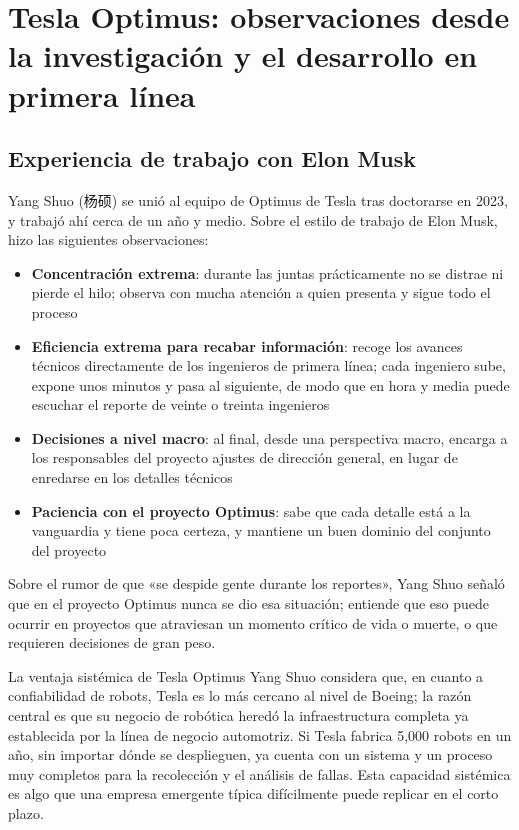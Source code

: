 \section{Tesla Optimus: observaciones desde la investigación y el desarrollo en primera línea}

\subsection{Experiencia de trabajo con Elon Musk}

Yang Shuo (杨硕) se unió al equipo de Optimus de Tesla tras doctorarse en 2023, y trabajó ahí cerca de un año y medio. Sobre el estilo de trabajo de Elon Musk, hizo las siguientes observaciones:

\begin{itemize}
    \item \textbf{Concentración extrema}: durante las juntas prácticamente no se distrae ni pierde el hilo; observa con mucha atención a quien presenta y sigue todo el proceso
    \item \textbf{Eficiencia extrema para recabar información}: recoge los avances técnicos directamente de los ingenieros de primera línea; cada ingeniero sube, expone unos minutos y pasa al siguiente, de modo que en hora y media puede escuchar el reporte de veinte o treinta ingenieros
    \item \textbf{Decisiones a nivel macro}: al final, desde una perspectiva macro, encarga a los responsables del proyecto ajustes de dirección general, en lugar de enredarse en los detalles técnicos
    \item \textbf{Paciencia con el proyecto Optimus}: sabe que cada detalle está a la vanguardia y tiene poca certeza, y mantiene un buen dominio del conjunto del proyecto
\end{itemize}

Sobre el rumor de que «se despide gente durante los reportes», Yang Shuo señaló que en el proyecto Optimus nunca se dio esa situación; entiende que eso puede ocurrir en proyectos que atraviesan un momento crítico de vida o muerte, o que requieren decisiones de gran peso.

\begin{knowledgebox}{La ventaja sistémica de Tesla Optimus}
Yang Shuo considera que, en cuanto a confiabilidad de robots, Tesla es lo más cercano al nivel de Boeing; la razón central es que su negocio de robótica heredó la infraestructura completa ya establecida por la línea de negocio automotriz. Si Tesla fabrica 5,000 robots en un año, sin importar dónde se desplieguen, ya cuenta con un sistema y un proceso muy completos para la recolección y el análisis de fallas. Esta capacidad sistémica es algo que una empresa emergente típica difícilmente puede replicar en el corto plazo.
\end{knowledgebox}

